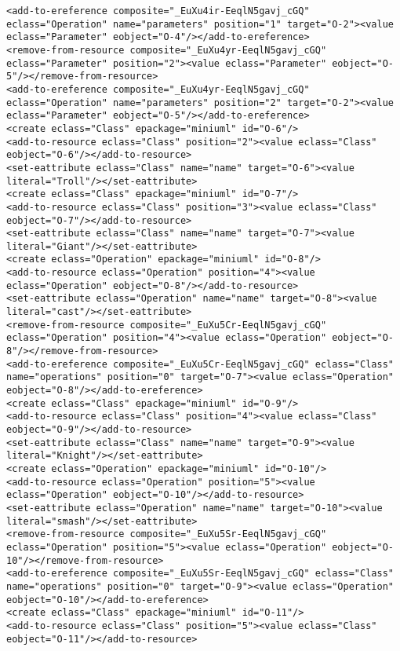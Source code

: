\begin{lstlisting}[style=cbpfile,caption={Change-based representation of the model in Figure \ref{fig:class_diagram_left}.},label=lst:class_diagram_left_cbpfile]
<add-to-ereference composite="_EuXu4ir-EeqlN5gavj_cGQ" eclass="Operation" name="parameters" position="1" target="O-2"><value eclass="Parameter" eobject="O-4"/></add-to-ereference>
<remove-from-resource composite="_EuXu4yr-EeqlN5gavj_cGQ" eclass="Parameter" position="2"><value eclass="Parameter" eobject="O-5"/></remove-from-resource>
<add-to-ereference composite="_EuXu4yr-EeqlN5gavj_cGQ" eclass="Operation" name="parameters" position="2" target="O-2"><value eclass="Parameter" eobject="O-5"/></add-to-ereference>
<create eclass="Class" epackage="miniuml" id="O-6"/>
<add-to-resource eclass="Class" position="2"><value eclass="Class" eobject="O-6"/></add-to-resource>
<set-eattribute eclass="Class" name="name" target="O-6"><value literal="Troll"/></set-eattribute>
<create eclass="Class" epackage="miniuml" id="O-7"/>
<add-to-resource eclass="Class" position="3"><value eclass="Class" eobject="O-7"/></add-to-resource>
<set-eattribute eclass="Class" name="name" target="O-7"><value literal="Giant"/></set-eattribute>
<create eclass="Operation" epackage="miniuml" id="O-8"/>
<add-to-resource eclass="Operation" position="4"><value eclass="Operation" eobject="O-8"/></add-to-resource>
<set-eattribute eclass="Operation" name="name" target="O-8"><value literal="cast"/></set-eattribute>
<remove-from-resource composite="_EuXu5Cr-EeqlN5gavj_cGQ" eclass="Operation" position="4"><value eclass="Operation" eobject="O-8"/></remove-from-resource>
<add-to-ereference composite="_EuXu5Cr-EeqlN5gavj_cGQ" eclass="Class" name="operations" position="0" target="O-7"><value eclass="Operation" eobject="O-8"/></add-to-ereference>
<create eclass="Class" epackage="miniuml" id="O-9"/>
<add-to-resource eclass="Class" position="4"><value eclass="Class" eobject="O-9"/></add-to-resource>
<set-eattribute eclass="Class" name="name" target="O-9"><value literal="Knight"/></set-eattribute>
<create eclass="Operation" epackage="miniuml" id="O-10"/>
<add-to-resource eclass="Operation" position="5"><value eclass="Operation" eobject="O-10"/></add-to-resource>
<set-eattribute eclass="Operation" name="name" target="O-10"><value literal="smash"/></set-eattribute>
<remove-from-resource composite="_EuXu5Sr-EeqlN5gavj_cGQ" eclass="Operation" position="5"><value eclass="Operation" eobject="O-10"/></remove-from-resource>
<add-to-ereference composite="_EuXu5Sr-EeqlN5gavj_cGQ" eclass="Class" name="operations" position="0" target="O-9"><value eclass="Operation" eobject="O-10"/></add-to-ereference>
<create eclass="Class" epackage="miniuml" id="O-11"/>
<add-to-resource eclass="Class" position="5"><value eclass="Class" eobject="O-11"/></add-to-resource>

\end{lstlisting}
